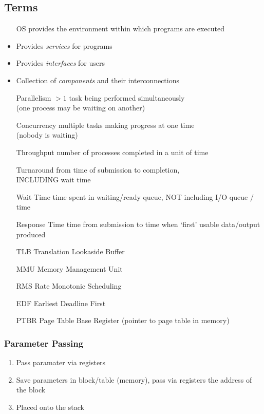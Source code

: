 \documentclass[a4paper]{article}
\newcommand{\resetsize}{\small}
\begin{document}
\begin{multicols*}{2}
    \resetsize
    \subsection*{Terms}
    \setlength{\leftmargini}{6em}
    \begin{itemize}
        \item[OS] provides the environment within which programs are executed
        \item Provides \emph{services} for programs
        \item Provides \emph{interfaces} for users
        \item Collection of \emph{components} and their interconnections
        \item[Parallelism] \(> 1\) task being performed simultaneously \\
            (one process may be waiting on another)
        \item[Concurrency] multiple tasks making progress at one time \\
            (nobody is waiting)
        \item[Throughput] number of processes completed in a unit of time
        \item[Turnaround] from time of submission to completion, \\
            INCLUDING wait time
        \item[Wait Time] time spent in waiting/ready queue, NOT including I/O queue / time
        \item[Response Time] time from submission to time when `first' usable data/output produced
        \item[TLB] Translation Lookaside Buffer
        \item[MMU] Memory Management Unit
        \item[RMS] Rate Monotonic Scheduling
        \item[EDF] Earliest Deadline First
        \item[PTBR] Page Table Base Register (pointer to page table in memory)
    \end{itemize}

    \subsubsection*{Parameter Passing}
    \setlength{\leftmargini}{2em}
    \begin{enumerate}
        \item Pass paramater via registers
        \item Save parameters in block/table (memory), pass via registers the
              address of the block
        \item Placed onto the stack
    \end{enumerate}

\end{multicols*}
\end{document}
